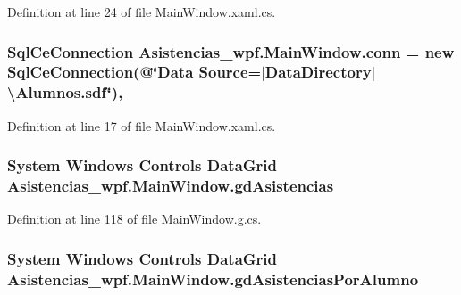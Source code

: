 Definition at line 24 of file Main\-Window.\-xaml.\-cs.

\hypertarget{class_asistencias__wpf_1_1_main_window_a475e7650f0bbc7b9b2851de2ccdb1af1}{
\subsubsection[{conn}]{\setlength{\rightskip}{0pt plus 5cm}Sql\-Ce\-Connection Asistencias\-\_\-wpf.\-Main\-Window.\-conn = new Sql\-Ce\-Connection(@\char`\"{}Data Source=$|$Data\-Directory$|$\textbackslash{}Alumnos.\-sdf\char`\"{})\hspace{0.3cm}{\ttfamily [static]}, {\ttfamily [private]}}}\label{class_asistencias__wpf_1_1_main_window_a475e7650f0bbc7b9b2851de2ccdb1af1}


Definition at line 17 of file Main\-Window.\-xaml.\-cs.

\hypertarget{class_asistencias__wpf_1_1_main_window_a813953ed3cd32fbaea64c551ae2728c9}{
\subsubsection[{gd\-Asistencias}]{\setlength{\rightskip}{0pt plus 5cm}System Windows Controls Data\-Grid Asistencias\-\_\-wpf.\-Main\-Window.\-gd\-Asistencias\hspace{0.3cm}{\ttfamily [package]}}}\label{class_asistencias__wpf_1_1_main_window_a813953ed3cd32fbaea64c551ae2728c9}


Definition at line 118 of file Main\-Window.\-g.\-cs.

\hypertarget{class_asistencias__wpf_1_1_main_window_ae0a45b8720275659efc30b621e482e40}{
\subsubsection[{gd\-Asistencias\-Por\-Alumno}]{\setlength{\rightskip}{0pt plus 5cm}System Windows Controls Data\-Grid Asistencias\-\_\-wpf.\-Main\-Window.\-gd\-Asistencias\-Por\-Alumno\hspace{0.3cm}{\ttfamily [package]}}}\label{class_asistencias__wpf_1_1_main_window_ae0a45b8720275659efc30b621e482e40}


